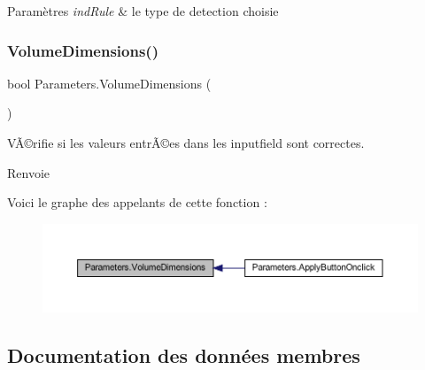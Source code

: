 \begin{DoxyParams}{Paramètres}
{\em ind\+Rule} & le type de detection choisie\\
\hline
\end{DoxyParams}
\mbox{\label{class_parameters_a92f68fa9992b1066153a6175dd37dc36}} 
\subsubsection{\texorpdfstring{Volume\+Dimensions()}{VolumeDimensions()}}
{\footnotesize\ttfamily bool Parameters.\+Volume\+Dimensions (\begin{DoxyParamCaption}{ }\end{DoxyParamCaption})\hspace{0.3cm}{\ttfamily [inline]}}



VÃ©rifie si les valeurs entrÃ©es dans les inputfield sont correctes. 

\begin{DoxyReturn}{Renvoie}

\end{DoxyReturn}
Voici le graphe des appelants de cette fonction \+:
\nopagebreak
\begin{figure}[H]
\begin{center}
\leavevmode
\includegraphics[width=350pt]{class_parameters_a92f68fa9992b1066153a6175dd37dc36_icgraph}
\end{center}
\end{figure}


\subsection{Documentation des données membres}
\mbox{\label{class_parameters_ada09985fa2537e0d28f616e0d9b86fb4}} 
